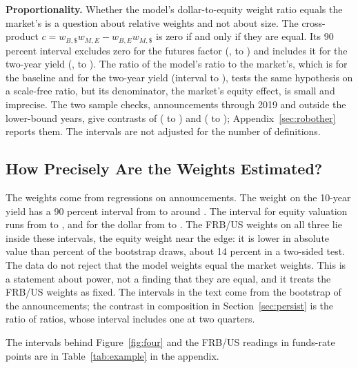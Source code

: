 \documentclass[11pt]{article}
\begin{document}
\textbf{Proportionality.} Whether the model's dollar-to-equity weight ratio equals the market's is a question about relative weights and not about size. The cross-product $c=w_{B,\$}w_{M,E}-w_{B,E}w_{M,\$}$ is zero if and only if they are equal. Its 90 percent interval excludes zero for the futures factor (,  to ) and includes it for the two-year yield (,  to ). The ratio of the model's ratio to the market's, which is  for the baseline and  for the two-year yield (interval  to ), tests the same hypothesis on a scale-free ratio, but its denominator, the market's equity effect, is small and imprecise. The two sample checks, announcements through 2019 and outside the lower-bound years, give contrasts of  ( to ) and  ( to ); Appendix~\ref{sec:robother} reports them. The intervals are not adjusted for the number of definitions.

\subsection{How Precisely Are the Weights Estimated?}\label{sec:precision}
The weights come from regressions on  announcements. The weight on the 10-year yield has a 90 percent interval from  to  around . The interval for equity valuation runs from  to , and for the dollar from  to . The FRB/US weights on all three lie inside these intervals, the equity weight near the edge: it is lower in absolute value than  percent of the bootstrap draws, about 14 percent in a two-sided test. The data do not reject that the model weights equal the market weights. This is a statement about power, not a finding that they are equal, and it treats the FRB/US weights as fixed. The intervals in the text come from the bootstrap of the announcements; the contrast in composition in Section~\ref{sec:persist} is the ratio of ratios, whose interval includes one at two quarters.


The intervals behind Figure~\ref{fig:four} and the FRB/US readings in funds-rate points are in Table~\ref{tab:example} in the appendix.
\end{document}
